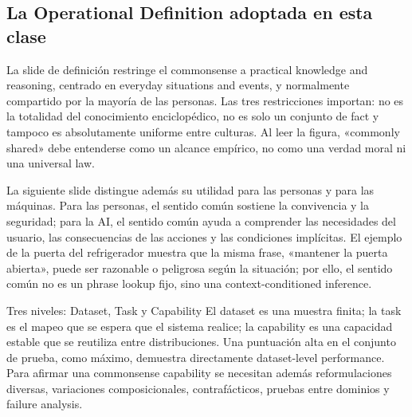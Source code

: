 
\subsection{La Operational Definition adoptada en esta clase}

La slide de definición restringe el commonsense a practical knowledge and reasoning, centrado en everyday situations and events, y normalmente compartido por la mayoría de las personas. Las tres restricciones importan: no es la totalidad del conocimiento enciclopédico, no es solo un conjunto de fact y tampoco es absolutamente uniforme entre culturas. Al leer la figura, «commonly shared» debe entenderse como un alcance empírico, no como una verdad moral ni una universal law.


La siguiente slide distingue además su utilidad para las personas y para las máquinas. Para las personas, el sentido común sostiene la convivencia y la seguridad; para la AI, el sentido común ayuda a comprender las necesidades del usuario, las consecuencias de las acciones y las condiciones implícitas. El ejemplo de la puerta del refrigerador muestra que la misma frase, «mantener la puerta abierta», puede ser razonable o peligrosa según la situación; por ello, el sentido común no es un phrase lookup fijo, sino una context-conditioned inference.


\begin{importantbox}{Tres niveles: Dataset, Task y Capability}
El dataset es una muestra finita; la task es el mapeo que se espera que el sistema realice; la capability es una capacidad estable que se reutiliza entre distribuciones. Una puntuación alta en el conjunto de prueba, como máximo, demuestra directamente dataset-level performance. Para afirmar una commonsense capability se necesitan además reformulaciones diversas, variaciones composicionales, contrafácticos, pruebas entre dominios y failure analysis.
\end{importantbox}


